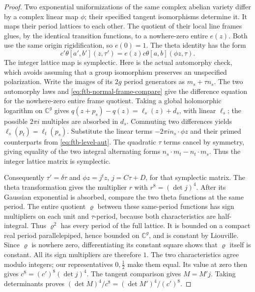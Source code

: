 \begin{proof}
Two exponential uniformizations of the same complex abelian variety
differ by a complex linear map \(\phi\); their specified tangent
isomorphisms determine it.  It maps their period lattices to each
other.  The quotient of their local line frames glues, by the
identical transition functions, to a nowhere-zero entire \(e(z)\).
Both use the same origin rigidification, so \(e(0)=1\).
The theta identity has the form
\[
        c'\theta[a',b'](z,\tau')
                 =e(z)c\theta[a,b](\phi z,\tau).
 \tag{R2}\label{eq:ftb-normal-frame-compare}
\]
The integer lattice map is symplectic.  Here is the actual
automorphy check, which avoids assuming that a group isomorphism
preserves an unspecified polarization.  Write the images of its
\(2g\) period generators as \(m_s+\tau n_s\).
The two automorphy laws and \eqref{eq:ftb-normal-frame-compare}
give the difference equation for the nowhere-zero entire frame
quotient.  Taking a global holomorphic logarithm on \(\mathbb C^g\)
gives
\(q(z+p_s)-q(z)=\ell_s(z)+d_s\), with linear \(\ell_s\);
the possible \(2\pi i\) multiples are absorbed in \(d_s\).
Commuting two differences yields
\(\ell_s(p_t)=\ell_t(p_s)\).
Substitute the linear terms \(-2\pi i n_s\cdot\phi z\)
and their primed counterparts from \eqref{eq:ftb-level-aut}.
The quadratic \(\tau\) terms cancel by symmetry, giving equality
of the two integral alternating forms
\(n_s\cdot m_t-n_t\cdot m_s\).
Thus the integer lattice matrix is symplectic.

Consequently \(\tau'=\delta\tau\) and
\(\phi z=j^tz\), \(j=C\tau+D\), for that symplectic matrix.
The theta transformation gives the multiplier \(r\) with
\(r^8=(\det j)^4\).
After its Gaussian exponential is absorbed, compare the two
theta functions at the same period.  The entire quotient \(\varrho\) between these same-period
functions has sign multipliers on each unit and \(\tau\)-period,
because both characteristics are half-integral.
Thus \(\varrho^2\) has every period of the full lattice.
It is bounded on a compact real period parallelepiped, hence
bounded on \(\mathbb C^g\), and is constant by Liouville.
Since \(\varrho\) is nowhere zero, differentiating its constant
square shows that \(\varrho\) itself is constant.
All its sign multipliers are therefore \(1\).
The two characteristics agree modulo integers; our representatives
\(0,\tfrac12\) make them equal.  Its value at zero then gives
\(c^8=(c')^8(\det j)^4\).
The tangent comparison gives \(M=M'j\).
Taking determinants proves
\((\det M)^4/c^8=(\det M')^4/(c')^8\).
\end{proof}

